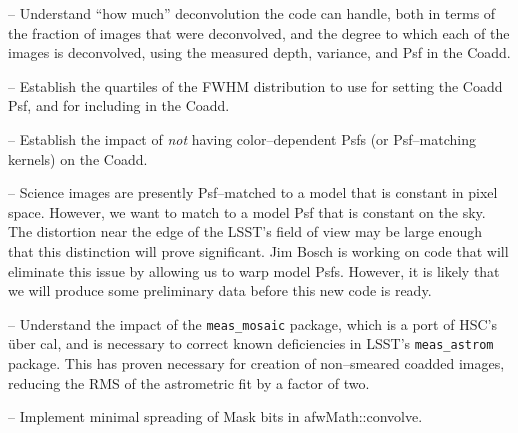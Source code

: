 \documentclass[prd, nofootinbib, floatfix, 11pt,tightenlines,times]{article}
\begin{document}




-- Understand ``how much'' deconvolution the code can handle, both in
terms of the fraction of images that were deconvolved, and the degree
to which each of the images is deconvolved, using the measured depth,
variance, and Psf in the Coadd.

-- Establish the quartiles of the FWHM distribution to use for setting
the Coadd Psf, and for including in the Coadd.

-- Establish the impact of {\it not} having color--dependent Psfs (or
Psf--matching kernels) on the Coadd.

-- Science images are presently Psf--matched to a model that is
constant in pixel space.  However, we want to match to a model Psf
that is constant on the sky.  The distortion near the edge of the
LSST's field of view may be large enough that this distinction will
prove significant. Jim Bosch is working on code that will eliminate
this issue by allowing us to warp model Psfs.  However, it is likely
that we will produce some preliminary data before this new code is
ready.

-- Understand the impact of the {\tt meas\_mosaic} package, which is a
port of HSC's \"{u}ber cal, and is necessary to correct known
deficiencies in LSST's {\tt meas\_astrom} package.  This has proven
necessary for creation of non--smeared coadded images, reducing the
RMS of the astrometric fit by a factor of two.

-- Implement minimal spreading of Mask bits in afwMath::convolve.

%
%
%
%
%
\end{document}
